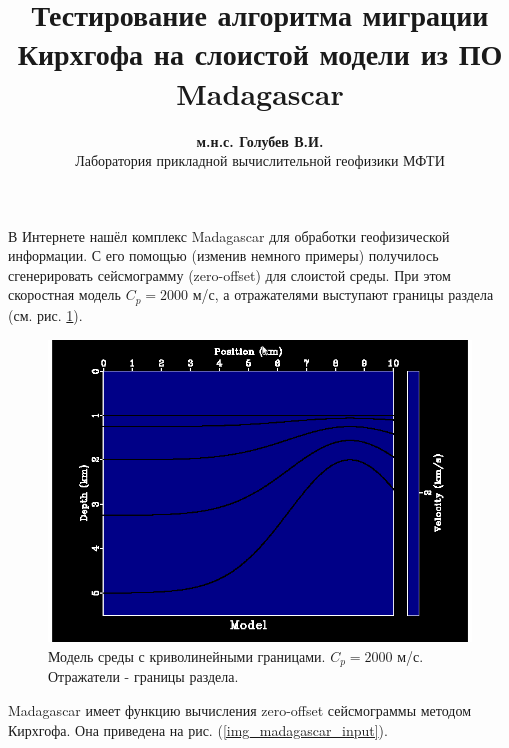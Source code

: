 \documentclass{article}
\begin{document}
\title{Тестирование алгоритма миграции Кирхгофа на слоистой модели из ПО Madagascar}
\author{\textbf{м.н.с. Голубев В.И.} \\ Лаборатория прикладной вычислительной геофизики МФТИ}
\maketitle

В Интернете нашёл комплекс Madagascar для обработки геофизической информации.
С его помощью (изменив немного примеры) получилось сгенерировать сейсмограмму (zero-offset) для слоистой среды.
При этом скоростная модель $C_p=2000$ м/с, а отражателями выступают границы раздела (см. рис. \ref{img_model}).

\begin{figure}[ht]
  \center
  \includegraphics[scale=0.5]{pic/model.png}
  \caption{Модель среды с криволинейными границами. $C_p=2000$ м/с. Отражатели - границы раздела.}
\label{img_model}
\end{figure}

Madagascar имеет функцию вычисления zero-offset сейсмограммы методом Кирхгофа.
Она приведена на рис. (\ref{img_madagascar_input}).
\end{document}
